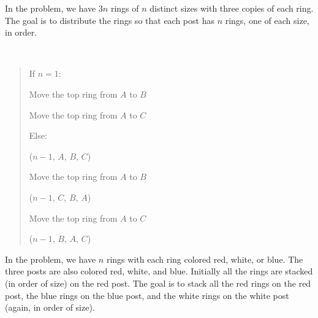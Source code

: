 \documentclass[10pt]{article}
\begin{document}
In the  problem, we have \( 3n \) rings of \( n \) distinct sizes with three copies of each ring. The goal is to distribute the rings so that each post has \( n \) rings, one of each size, in order.

\begin{solution}\ %
\begin{quote}
\noindent{}%

%

\begin{steps}
  \item If \( n = 1 \):
    \begin{steps}
    \item Move the top ring from \( A \) to \( B \)
    \item Move the top ring from \( A \) to \( C \)
    \end{steps}
  \item Else:
    \begin{steps}
    \item {}(\( n-1 \), \( A \), \( B \), \( C \)) 
    \item Move the top ring from \( A \) to \( B \)
    \item {}(\( n-1 \), \( C \), \( B \), \( A \)) 
    \item Move the top ring from \( A \) to \( C \)
    \item {}(\( n-1 \), \( B \), \( A \), \( C \)) 
    \end{steps}
\end{steps}

\end{quote}
\end{solution}
\pagebreak

In the  problem, we have \( n \) rings with each ring colored red, white, or blue. The three posts are also colored red, white, and blue. Initially all the rings are stacked (in order of size) on the red post. The goal is to stack all the red rings on the red post, the blue rings on the blue post, and the white rings on the white post (again, in order of size).
\end{document}
